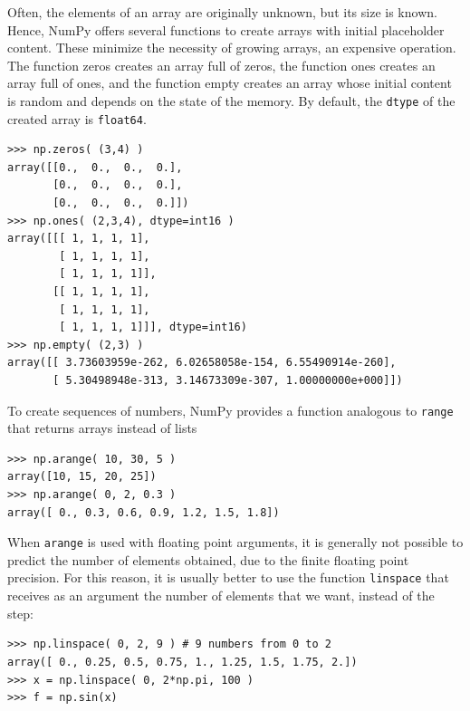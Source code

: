\documentclass[12pt]{article}
\begin{document}
Often, the elements of an array are originally unknown, but its size is known. Hence, NumPy offers several functions to create arrays with initial placeholder content. These minimize the necessity of growing arrays, an expensive operation.
The function zeros creates an array full of zeros, the function ones creates an array full of ones, and the function empty creates an array whose initial content is random and depends on the state of the memory. By default, the \texttt{dtype} of the created array is \texttt{float64}.
\footnotesize
\begin{Verbatim}[frame=single]
>>> np.zeros( (3,4) )
array([[0.,  0.,  0.,  0.],
       [0.,  0.,  0.,  0.],
       [0.,  0.,  0.,  0.]])
>>> np.ones( (2,3,4), dtype=int16 )    
array([[[ 1, 1, 1, 1],
        [ 1, 1, 1, 1],
        [ 1, 1, 1, 1]],
       [[ 1, 1, 1, 1],
        [ 1, 1, 1, 1],
        [ 1, 1, 1, 1]]], dtype=int16)
>>> np.empty( (2,3) )
array([[ 3.73603959e-262, 6.02658058e-154, 6.55490914e-260],
       [ 5.30498948e-313, 3.14673309e-307, 1.00000000e+000]])
\end{Verbatim}
\normalsize

To create sequences of numbers, NumPy provides a function analogous to \texttt{range} that returns arrays instead of lists
\footnotesize
\begin{Verbatim}[frame=single]
>>> np.arange( 10, 30, 5 )
array([10, 15, 20, 25])
>>> np.arange( 0, 2, 0.3 )                
array([ 0., 0.3, 0.6, 0.9, 1.2, 1.5, 1.8])
\end{Verbatim}
\normalsize

When \texttt{arange} is used with floating point arguments, it is generally not possible to predict the number of elements obtained, due to the finite floating point precision. For this reason, it is usually better to use the function \texttt{linspace} that receives as an argument the number of elements that we want, instead of the step:
\footnotesize
\begin{Verbatim}[frame=single]
>>> np.linspace( 0, 2, 9 ) # 9 numbers from 0 to 2
array([ 0., 0.25, 0.5, 0.75, 1., 1.25, 1.5, 1.75, 2.])
>>> x = np.linspace( 0, 2*np.pi, 100 ) 
>>> f = np.sin(x)
\end{Verbatim}
\normalsize
\end{document}
